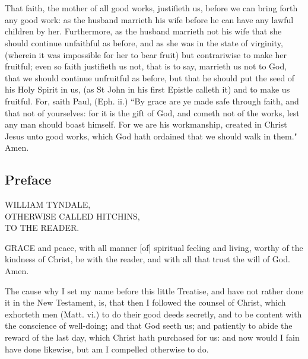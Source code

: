\section*{}

{\tiny
That faith, the mother of all good works, justifieth us, before we can bring 
forth any good work: as the husband marrieth his wife before he can have 
any lawful children by her. Furthermore, as the husband marrieth not 
his wife that she should continue unfaithful as before, and as she was in 
the state of virginity, (wherein it was impossible for her to bear fruit) but 
contrariwise to make her fruitful; even so faith justifieth us not, that is to 
say, marrieth us not to God, that we should continue unfruitful as before, 
but that he should put the seed of his Holy Spirit in us, (as St John in his 
first Epistle calleth it) and to make us fruitful. For, saith Paul, (Eph. ii.) 
``By grace are ye made safe through faith, and that not of yourselves: for 
it is the gift of God, and cometh not of the works, lest any man should 
boast himself. For we are his workmanship, created in Christ Jesus unto 
good works, which God hath ordained that we should walk in them." Amen. 
}


\subsection*{Preface}
\begin{center}
WILLIAM TYNDALE,\\
OTHERWISE CALLED HITCHINS,\\
TO THE READER. 
\end{center}



GRACE and peace, with all manner [of]
spiritual feeling and living, worthy of the
kindness of Christ, be with the reader, and with 
all that trust the will of God. Amen. 

The cause why I set my name before this
little Treatise, and have not rather done it in
the New Testament, is, that then I followed
the counsel of Christ, which exhorteth men
(Matt. vi.) to do their good deeds secretly, and
to be content with the conscience of well-doing; 
and that God seeth us; and patiently to abide 
the reward of the last day, which Christ hath 
purchased for us: and now would I fain have 
done likewise, but am I compelled otherwise 
to do. 

